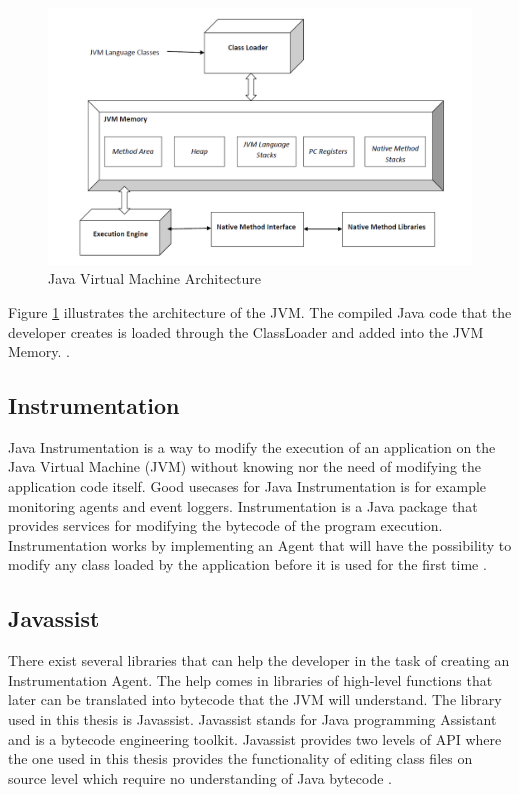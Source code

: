 \begin{figure}
    \centering
    \includegraphics[width=\textwidth]{images/JvmSpec7.png}
    \caption{Java Virtual Machine Architecture}
    \label{fig:JVM}
\end{figure}

Figure \ref{fig:JVM} illustrates the architecture of the JVM. The compiled Java code that the developer creates is loaded through the ClassLoader and added into the JVM Memory. \parencite{venners_1999}.



\subsection{Instrumentation}
Java Instrumentation is a way to modify the execution of an application on the Java Virtual Machine (JVM) without knowing nor the need of modifying the application code itself. Good usecases for Java Instrumentation is for example monitoring agents and event loggers. Instrumentation is a Java package that provides services for modifying the bytecode of the program execution. Instrumentation works by implementing an Agent that will have the possibility to modify any class loaded by the application before it is used for the first time \parencite{Java_Instrument}.



\subsection{Javassist}
There exist several libraries that can help the developer in the task of creating an Instrumentation Agent. The help comes in libraries of high-level functions that later can be translated into bytecode that the JVM will understand. The library used in this thesis is Javassist. Javassist stands for Java programming Assistant and is a bytecode engineering toolkit. Javassist provides two levels of API where the one used in this thesis provides the functionality of editing class files on source level which require no understanding of Java bytecode \parencite{Javassist}.